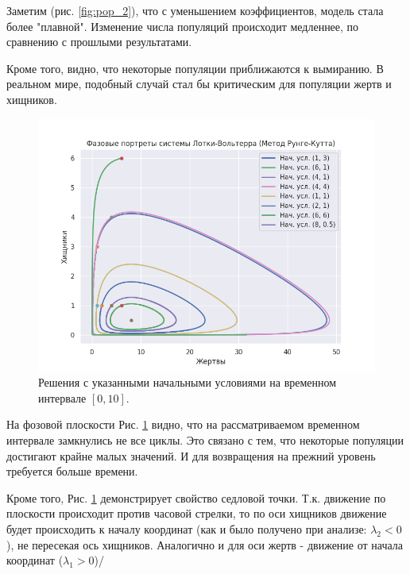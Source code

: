Заметим (рис. \ref{fig:pop_2}), что с уменьшением коэффициентов, модель стала более "плавной". Изменение числа популяций происходит медленнее, по сравнению с прошлыми результатами. 

Кроме того, видно, что некоторые популяции приближаются к вымиранию. В реальном мире, подобный случай стал бы критическим для популяции жертв и хищников.

\begin{figure}[h]  %
	\centering
	\includegraphics[width=1\textwidth]{imgs/phase_2.png}  %
	\caption{Решения с указанными начальными условиями на временном интервале $[0,10]$.}  %
	\label{fig:phase_2}  %
\end{figure}

На фозовой плоскости Рис. \ref{fig:phase_2} видно, что на рассматриваемом временном интервале замкнулись не все циклы. 
Это связано с тем, что некоторые популяции достигают крайне малых значений. И для возвращения на прежний уровень требуется больше времени.

Кроме того, Рис. \ref{fig:phase_2} демонстрирует свойство седловой точки. Т.к. движение по плоскости происходит против часовой стрелки, то по оси хищников движение будет происходить к началу координат (как и было получено при анализе: $\lambda_2 < 0$), не пересекая ось хищников. Аналогично и для оси жертв - движение от начала координат ($\lambda_1 > 0$)/